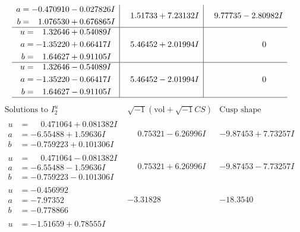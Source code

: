 \documentclass[1p]{elsarticle_modified}
\theoremstyle{definition}
\newcommand{\I}{\sqrt{-1}}
\begin{document}
$$\begin{array}{c|c|c}
\begin{aligned}
a &= -0.470910 - 0.027826 I \\
b &= \phantom{-}1.076530 + 0.676865 I\end{aligned}
 & \phantom{-}1.51733 + 7.23132 I & \phantom{-}9.77735 - 2.80982 I \\ \hline\begin{aligned}
u &= \phantom{-}1.32646 + 0.54089 I \\
a &= -1.35220 + 0.66417 I \\
b &= \phantom{-}1.64627 + 0.91105 I\end{aligned}
 & \phantom{-}5.46452 + 2.01994 I & \phantom{-0.000000 } 0 \\ \hline\begin{aligned}
u &= \phantom{-}1.32646 - 0.54089 I \\
a &= -1.35220 - 0.66417 I \\
b &= \phantom{-}1.64627 - 0.91105 I\end{aligned}
 & \phantom{-}5.46452 - 2.01994 I & \phantom{-0.000000 } 0\\
 \hline 
 \end{array}$$\newpage$$\begin{array}{c|c|c}  
\text{Solutions to }I^u_{2}& \I (\text{vol} + \sqrt{-1}CS) & \text{Cusp shape}\\
 \hline 
\begin{aligned}
u &= \phantom{-}0.471064 + 0.081382 I \\
a &= -6.55488 + 1.59636 I \\
b &= -0.759223 + 0.101306 I\end{aligned}
 & \phantom{-}0.75321 - 6.26996 I & -9.87453 + 7.73257 I \\ \hline\begin{aligned}
u &= \phantom{-}0.471064 - 0.081382 I \\
a &= -6.55488 - 1.59636 I \\
b &= -0.759223 - 0.101306 I\end{aligned}
 & \phantom{-}0.75321 + 6.26996 I & -9.87453 - 7.73257 I \\ \hline\begin{aligned}
u &= -0.456992\phantom{ +0.000000I} \\
a &= -7.97352\phantom{ +0.000000I} \\
b &= -0.778866\phantom{ +0.000000I}\end{aligned}
 & -3.31828\phantom{ +0.000000I} & -18.3540\phantom{ +0.000000I} \\ \hline\begin{aligned}
u &= -1.51659 + 0.78555 I \\

\end{aligned}
\end{array}$$
\end{document}
